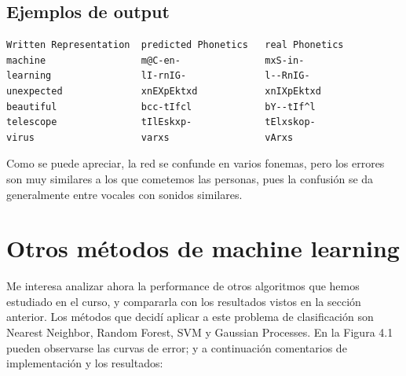 \documentclass[paper=a4, fontsize=11pt]{scrartcl} %
\numberwithin{equation}{section} %
\numberwithin{figure}{section} %
\numberwithin{table}{section} %
\begin{document}
\subsection{Ejemplos de output}

\begin{center}
\begin{BVerbatim}
Written Representation  predicted Phonetics   real Phonetics  
machine                 m@C-en-               mxS-in-  
learning                lI-rnIG-              l--RnIG- 
unexpected              xnEXpEktxd            xnIXpEktxd  
beautiful               bcc-tIfcl             bY--tIf^l 
telescope               tIlEskxp-             tElxskop- 
virus                   varxs                 vArxs

\end{BVerbatim}
\end{center}


Como se puede apreciar, la red se confunde en varios fonemas, pero los errores son muy similares a los que cometemos las personas, pues la confusión se da generalmente entre vocales con sonidos similares. \\

\section{ Otros métodos de machine learning }


Me interesa analizar ahora la performance de otros algoritmos que hemos estudiado en el curso, y compararla con los resultados vistos en la sección anterior. Los métodos que decidí aplicar a este problema de clasificación son Nearest Neighbor, Random Forest, SVM y Gaussian Processes. En la Figura 4.1 pueden observarse las curvas de error; y a continuación comentarios de implementación y los resultados:
\end{document}

